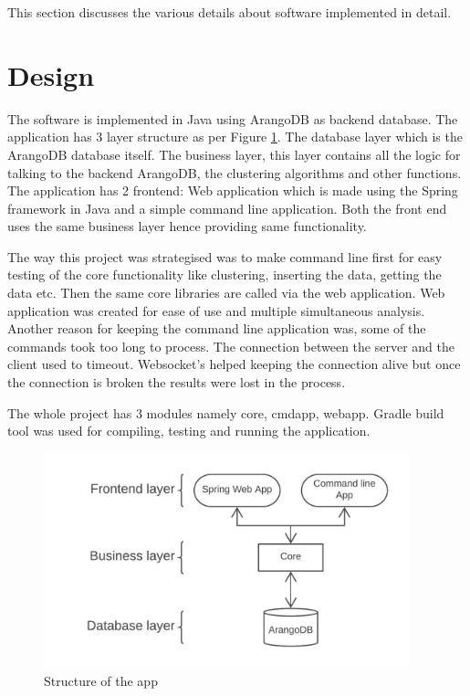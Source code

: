 This section discusses the various details about software implemented in detail.

\section{Design}

The software is implemented in Java using ArangoDB as backend database. The application has 3 layer structure as per Figure \ref{fig:appdesign}. The database layer which is the ArangoDB database itself. The business layer, this layer contains all the logic for talking to the backend ArangoDB, the clustering algorithms and other functions. The application has 2 frontend: Web application which is made using the Spring framework in Java and a simple command line application. Both the front end uses the same business layer hence providing same functionality. 

The way this project was strategised was to make command line first for easy testing of the core functionality like clustering, inserting the data, getting the data etc. Then the same core libraries are called via the web application. Web application was created for ease of use and multiple simultaneous analysis. Another reason for keeping the command line application was, some of the commands took too long to process. The connection between the server and the client used to timeout. Websocket's helped keeping the connection alive but once the connection is broken the results were lost in the process.

The whole project has 3 modules namely core, cmdapp, webapp. Gradle build tool was used for compiling, testing and running the application. 

\begin{figure}[ht]
	\centering
	\includegraphics[width=300pt]{appdesign}
	\caption{\label{fig:appdesign} Structure of the app}
\end{figure}

